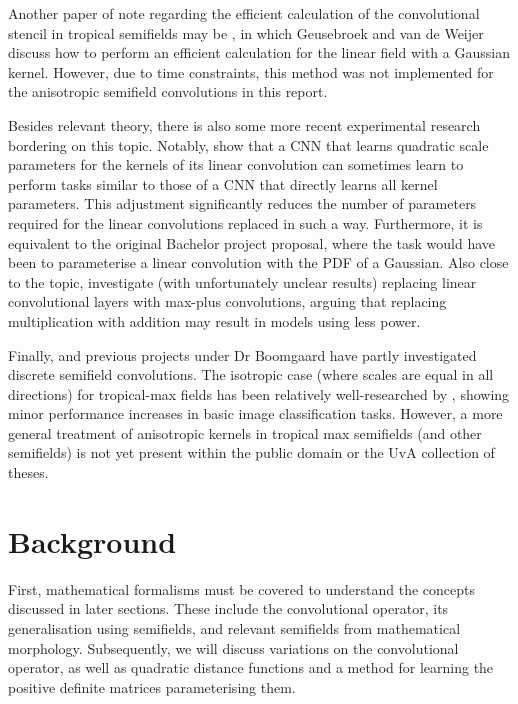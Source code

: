 \documentclass[a4paper, 12pt]{report}
\begin{document}
Another paper of note regarding the efficient calculation of the convolutional stencil in tropical semifields may be \cite{fastanifilter}, in which Geusebroek and van de Weijer discuss how to perform an efficient calculation for the linear field with a Gaussian kernel. However, due to time constraints, this method was not implemented for the anisotropic semifield convolutions in this report.

Besides relevant theory, there is also some more recent experimental research bordering on this topic. Notably, \cite{qlin1, qlin2} show that a CNN that learns quadratic scale parameters for the kernels of its linear convolution can sometimes learn to perform tasks similar to those of a CNN that directly learns all kernel parameters. This adjustment significantly reduces the number of  parameters required for the linear convolutions replaced in such a way. Furthermore, it is equivalent to the original Bachelor project proposal, where the task would have been to parameterise a linear convolution with the PDF of a Gaussian.
Also close to the topic, \cite{fan2021alternative} investigate (with unfortunately unclear results) replacing linear convolutional layers with max-plus convolutions, arguing that replacing multiplication with addition may result in models using less power.

Finally, \cite{groenendijk2022morphpool} and previous projects under Dr Boomgaard have partly investigated discrete semifield convolutions. The isotropic case (where scales are equal in all directions) for tropical-max fields has been relatively well-researched by \cite{thierrybsc, koenbsc}, showing minor performance increases in basic image classification tasks. However, a more general treatment of anisotropic kernels in tropical max semifields (and other semifields) is not yet present within the public domain or the UvA collection of theses.

\chapter{Background}
First, mathematical formalisms must be covered to understand the concepts discussed in later sections. These include the convolutional operator, its generalisation using semifields, and relevant semifields from mathematical morphology. Subsequently, we will discuss variations on the convolutional operator, as well as quadratic distance functions and a method for learning the positive definite matrices parameterising them.
\end{document}
